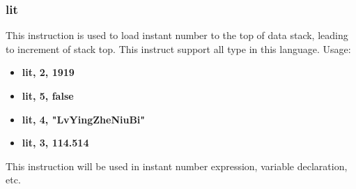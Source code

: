 \documentclass{article}
\begin{document}
		\subsubsection{lit}
		This instruction is used to load instant number to the top of data stack, leading to increment of stack top. This instruct support all type in this language. Usage: \\
		\begin{itemize}
		\item \textbf{lit, 2, 1919}
		\item \textbf{lit, 5, false}
		\item \textbf{lit, 4, "LvYingZheNiuBi"}
		\item \textbf{lit, 3, 114.514}
		\end{itemize}
		This instruction will be used in instant number expression, variable declaration, etc.
\end{document}
